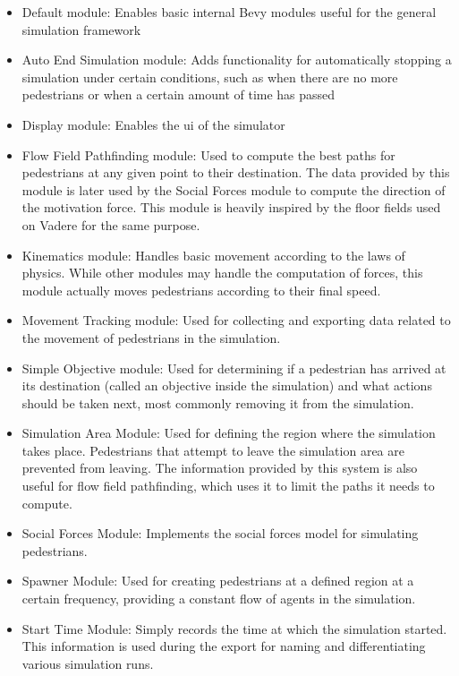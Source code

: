 \documentclass[twoside, 11pt]{article}
\begin{document}
\begin{itemize}
  \item Default module: Enables basic internal Bevy modules useful for the general simulation framework
  \item Auto End Simulation module: Adds functionality for automatically stopping a simulation under certain conditions, such as when there are no more pedestrians or when a certain amount of time has passed
  \item Display module: Enables the \gls{ui} of the simulator
  \item Flow Field Pathfinding module: Used to compute the best paths for pedestrians at any given point to their destination. The data provided by this module is later used by the Social Forces module to compute the direction of the motivation force. This module is heavily inspired by the floor fields used on Vadere for the same purpose.
  \item Kinematics module: Handles basic movement according to the laws of physics. While other modules may handle the computation of forces, this module actually moves pedestrians according to their final speed.
  \item Movement Tracking module: Used for collecting and exporting data related to the movement of pedestrians in the simulation.
  \item Simple Objective module: Used for determining if a pedestrian has arrived at its destination (called an objective inside the simulation) and what actions should be taken next, most commonly removing it from the simulation.
  \item Simulation Area Module: Used for defining the region where the simulation takes place. Pedestrians that attempt to leave the simulation area are prevented from leaving. The information provided by this system is also useful for flow field pathfinding, which uses it to limit the paths it needs to compute.
  \item Social Forces Module: Implements the social forces model for simulating pedestrians.
  \item Spawner Module: Used for creating pedestrians at a defined region at a certain frequency, providing a constant flow of agents in the simulation.
  \item Start Time Module: Simply records the time at which the simulation started. This information is used during the export for naming and differentiating various simulation runs.
\end{itemize}
\end{document}
